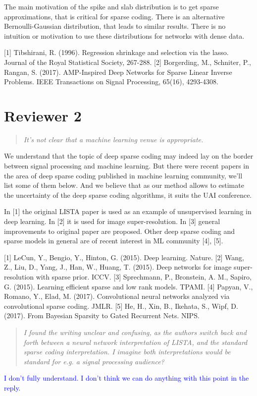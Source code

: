 \documentclass{article}
\begin{document}
The main motivation of the spike and slab distribution is to get sparse approximations, that is critical for sparse coding. There is an alternative Bernoulli-Gaussian distribution, that leads to similar results. There is no intuition or motivation to use these distributions for networks with dense data.

[1] Tibshirani, R. (1996). Regression shrinkage and selection via the lasso. Journal of the Royal Statistical Society, 267-288.
[2] Borgerding, M., Schniter, P., Rangan, S. (2017). AMP-Inspired Deep Networks for Sparse Linear Inverse Problems. IEEE Transactions on Signal Processing, 65(16), 4293-4308.

\section*{Reviewer 2}
\begin{quote}
\textit{It's not clear that a machine learning venue is appropriate.}
\end{quote}
We understand that the topic of deep sparse coding may indeed lay on the border between signal processing and machine learning. But there were recent papers in the area of deep sparse coding published in machine learning community, we'll list some of them below. And we believe that as our method allows to estimate the uncertainty of the deep sparse coding algorithms, it suits the UAI conference.

In [1] the original LISTA paper is used as an example of unsupervised learning in deep learning. In [2] it is used for image super-resolution. In [3] general improvements to original paper are proposed. Other deep sparse coding and sparse models in general are of recent interest in ML community [4], [5].

[1] LeCun, Y., Bengio, Y., Hinton, G. (2015). Deep learning. Nature.
[2] Wang, Z., Liu, D., Yang, J., Han, W., Huang, T. (2015). Deep networks for image super-resolution with sparse prior. ICCV.
[3] Sprechmann, P., Bronstein, A. M., Sapiro, G. (2015). Learning efficient sparse and low rank models. TPAMI.
[4] Papyan, V., Romano, Y., Elad, M. (2017). Convolutional neural networks analyzed via convolutional sparse coding. JMLR.
[5] He, H., Xin, B., Ikehata, S., Wipf, D. (2017). From Bayesian Sparsity to Gated Recurrent Nets. NIPS.

\begin{quote}
\textit{I found the writing unclear and confusing, as the authors switch back and forth between a neural network interpretation of LISTA, and the standard sparse coding interpretation. I imagine both interpretations would be standard for e.g. a signal processing audience?}
\end{quote}
\textcolor{blue}{I don't fully understand. I don't think we can do anything with this point in the reply.}
\end{document}
